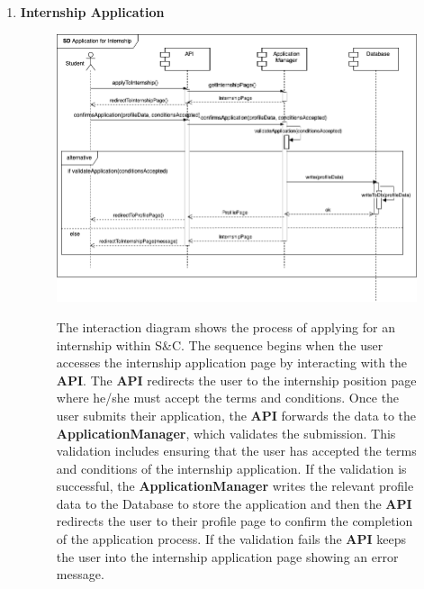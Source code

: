 \begin{enumerate}
    \newpage
    \item \textbf{Internship Application}
    \begin{figure}[h!]
            \centering  \includegraphics[width=1\textwidth]{DD/Images/Interactions/INT06_InternshipApplication.drawio.png}
            \label{fig:ComponentViewDiagram}
            \caption*{
            The interaction diagram shows the process of applying for an internship within S\&C. The sequence begins when the user accesses the internship application page by interacting with the \textbf{API}. The \textbf{API} redirects the user to the internship position page where he/she must accept the terms and conditions. Once the user submits their application, the \textbf{API} forwards the data to the \textbf{ApplicationManager}, which validates the submission. This validation includes ensuring that the user has accepted the terms and conditions of the internship application. If the validation is successful, the \textbf{ApplicationManager} writes the relevant profile data to the Database to store the application and then the \textbf{API} redirects the user to their profile page to confirm the completion of the application process.
            If the validation fails the \textbf{API} keeps the user into the internship application page showing an error message.
            }
    \end{figure}


\end{enumerate}
